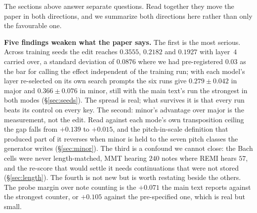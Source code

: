 \documentclass{article}
\begin{document}
%
The sections above answer separate questions. Read together they move the paper in both
directions, and we summarize both directions here rather than only the favourable one.

%
\textbf{Five findings weaken what the paper says.} The first is the most serious.
Across training seeds the edit reaches $0.3555$,
$0.2182$ and $0.1927$ with layer~$4$ carried over, a standard deviation of $0.0876$
where we had pre-registered $0.03$ as the bar for calling the effect independent of the
training run; with each model's layer re-selected on its own search prompts the six runs
give $0.279 \pm 0.042$ in major and $0.366 \pm 0.076$ in minor, still with the main
text's run the strongest in both modes (\S\ref{sec:seeds}). The spread is real; what
survives it is that every run beats its control on every key. The
second: minor's advantage over major is the measurement, not the edit. Read against
each mode's own transposition ceiling the gap falls from $+0.139$ to $+0.015$, and the
pitch-in-scale definition that produced part of it reverses when minor is held to the seven
pitch classes the generator writes (\S\ref{sec:minor}). The third is a confound we
cannot close: the Bach cells were never length-matched, MMT hearing $240$ notes where
REMI hears $57$, and the re-score that would settle it needs continuations that were
not stored (\S\ref{sec:length}). The fourth is not new but is worth restating beside
the others. The probe margin over note counting is the $+0.071$ the main text reports
against the strongest counter, or $+0.105$ against the pre-specified one, which is real
but small.
\end{document}

